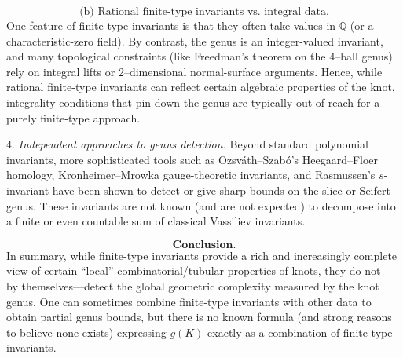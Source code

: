 \documentclass[12p]{article}
\newcounter{answercounter}
\newenvironment{answer}[1][]
{\refstepcounter{answercounter}%
\begin{tcolorbox}[
    title=Answer \theanswercounter: #1,
    colback=white, %
    colframe=gray,
    coltext=black, %
    fonttitle=\bfseries\normalsize,
    top=2mm,
    bottom=2mm,
    enlarge top initially by=5mm
]
\small
}
{\end{tcolorbox}}
\begin{document}
\begin{answer}[by openai/o1 (generated in 0 minutes and 50 seconds.)]
   \[
   \text{(b) Rational finite-type invariants vs.\ integral data.}
   \]
   One feature of finite-type invariants is that they often take values in \(\mathbb{Q}\) (or a characteristic-zero field).  By contrast, the genus is an integer-valued invariant, and many topological constraints (like Freedman’s theorem on the 4–ball genus) rely on integral lifts or 2–dimensional normal-surface arguments.  Hence, while rational finite-type invariants can reflect certain algebraic properties of the knot, integrality conditions that pin down the genus are typically out of reach for a purely finite-type approach.

4.  \emph{Independent approaches to genus detection.}
   Beyond standard polynomial invariants, more sophisticated tools such as Ozsváth–Szabó’s Heegaard–Floer homology, Kronheimer–Mrowka gauge-theoretic invariants, and Rasmussen’s \(s\)-invariant have been shown to detect or give sharp bounds on the slice or Seifert genus.  These invariants are not known (and are not expected) to decompose into a finite or even countable sum of classical Vassiliev invariants.  

\[
\textbf{Conclusion.}
\]
In summary, while finite-type invariants provide a rich and increasingly complete view of certain “local” combinatorial/tubular properties of knots, they do not—by themselves—detect the global geometric complexity measured by the knot genus.  One can sometimes combine finite-type invariants with other data to obtain partial genus bounds, but there is no known formula (and strong reasons to believe none exists) expressing \(g(K)\) exactly as a combination of finite-type invariants.
\end{answer}

 
\end{document}
